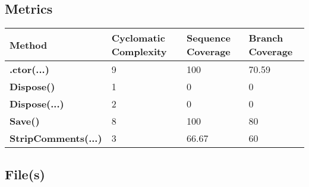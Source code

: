 \documentclass[a4paper,10pt]{article}
\begin{document}
\subsection{Metrics}
\begin{longtable}[l]{|l|l|l|l|}
\hline
\textbf{Method} & \textbf{Cyclomatic Complexity} & \textbf{Sequence Coverage} & \textbf{Branch Coverage}\\
\hline
\textbf{.ctor(...)} & 9 & 100 & 70.59\\
\hline
\textbf{Dispose()} & 1 & 0 & 0\\
\hline
\textbf{Dispose(...)} & 2 & 0 & 0\\
\hline
\textbf{Save()} & 8 & 100 & 80\\
\hline
\textbf{StripComments(...)} & 3 & 66.67 & 60\\
\hline
\end{longtable}
\subsection{File(s)}
\end{document}
